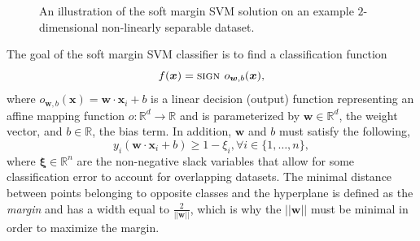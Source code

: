 \documentclass[reqno]{vcuthesis}
\newcommand{\norm}[1]{{||#1||}}
\newcommand{\reals}{{\mathbb{R}}}
\numberwithin{equation}{chapter}
\begin{document}
\begin{figure}[t!]
\begin{minipage}[b]{0.45\textwidth}
\caption{An illustration of the soft margin SVM solution on an example $2$-dimensional non-linearly separable dataset.}
\label{fig:nonlinsepdata}
\end{minipage}
\end{figure}

The goal of the soft margin SVM classifier is to find a classification function
\begin{equation}
\centering
f(\bm x) = \textsc{sign } o_{\bm w,b}(\bm x),
\label{eq:classificationfunction}
\end{equation}
where $o_{\bm w,b}(\bm x) = \bm{w}\cdot\bm{x}_i+b$ is a linear decision (output) function representing an affine mapping function $o: \reals^d \rightarrow \reals$ and is parameterized by $\bm w \in \reals^d$, the weight vector, and $b \in \reals$, the bias term. In addition, $\bm w$ and $b$ must satisfy the following,
\begin{equation}
y_i\left( \bm{w} \cdot \bm{x}_i + b\right) \geq 1 - \xi_i, \forall i \in \{1,\ldots,n\},
\label{eqn:softsvmconstraint}
\end{equation}
where $\bm \xi \in \reals^n$ are the non-negative slack variables that allow for some classification error to account for overlapping datasets. The minimal distance between points belonging to opposite classes and the hyperplane is defined as the \textit{margin} and has a width equal to $\frac{2}{||\bm{w}||}$, which is why the $\norm{\bm w}$ must be minimal in order to maximize the margin. 
\end{document}
